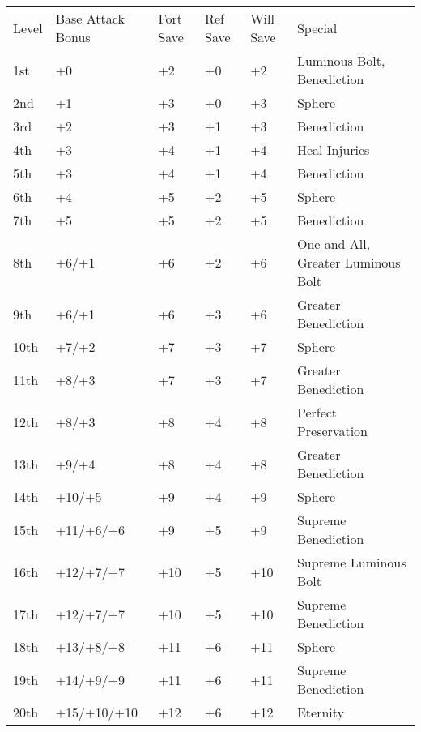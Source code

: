  \label{comm:class:curator}
\vspace*{-8pt}










\begin{table}[htb]
\begin{small}
\begin{tabular}{lp{3cm}p{0.7cm}p{0.7cm}p{0.7cm}l}
Level &Base Attack Bonus &Fort Save &Ref Save &Will Save &Special\\
1st &+0 &+2 &+0 &+2 &Luminous Bolt, Benediction\\
2nd &+1 &+3 &+0 &+3 &Sphere\\
3rd &+2 &+3 &+1 &+3 &Benediction\\
4th &+3 &+4 &+1 &+4 &Heal Injuries\\
5th &+3 &+4 &+1 &+4 &Benediction\\
6th &+4 &+5 &+2 &+5 &Sphere\\
7th &+5 &+5 &+2 &+5 &Benediction\\
8th &+6/+1 &+6 &+2 &+6 &One and All, Greater Luminous Bolt\\
9th &+6/+1 &+6 &+3 &+6 &Greater Benediction\\
10th &+7/+2 &+7 &+3 &+7 &Sphere\\
11th &+8/+3 &+7 &+3 &+7 &Greater Benediction\\
12th &+8/+3 &+8 &+4 &+8 &Perfect Preservation\\
13th &+9/+4 &+8 &+4 &+8 &Greater Benediction\\
14th &+10/+5 &+9 &+4 &+9 &Sphere\\
15th &+11/+6/+6 &+9 &+5 &+9 &Supreme Benediction\\
16th &+12/+7/+7 &+10 &+5 &+10 &Supreme Luminous Bolt\\
17th &+12/+7/+7 &+10 &+5 &+10 &Supreme Benediction\\
18th &+13/+8/+8 &+11 &+6 &+11 &Sphere\\
19th &+14/+9/+9 &+11 &+6 &+11 &Supreme Benediction\\
20th &+15/+10/+10 &+12 &+6 &+12 &Eternity\\
\end{tabular}
\end{small}
\end{table}

